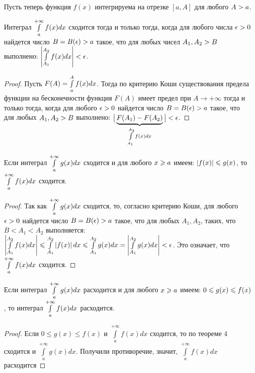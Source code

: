 \documentclass[a4paper,10pt]{article}
\begin{document}
	\begin{text}
		Пусть теперь функция $f(x)$ интегрируема на отрезке $[a, A]$
		 для любого $A \hm{>} a$.
	\end{text}
	
	\begin{nthm} \label{thm3}
		 Интеграл $\mathop{\int}\limits^{+ \infty}_a f(x)dx$ сходится тогда и только
		 тогда, когда для любого числа $\epsilon \hm{>} 0$ найдется число
		 $B \hm{=} B(\epsilon) \hm{>} a$ такое, что для любых чисел $A_1, A_2 \hm{>} B$
		 выполнено: $\left| \intl^{A_2}_{A_1} f(x)dx \right| \hm{<} \epsilon$.
	\end{nthm}
	\begin{proof}
		Пусть $F(A) \hm{=} \intl^A_a f(x)dx$. Тогда по критерию Коши существования
		 предела функции на бесконечности функция $F(A)$ имеет предел при $A\to+ \infty$
		 тогда и только тогда, когда для любого $\epsilon \hm{>} 0$ найдется число
		 $B \hm{=} B(\epsilon) \hm{>} a$ такое, что для любых $A_1, A_2 \hm{>} B$ выполнено:
		 $\big|\underbrace{ F(A_1) - F(A_2)}_{\int\limits_{A_1}^{A_2}f(x)dx}\big| \hm{<} \epsilon $. %
	\end{proof}
	
	\begin{nthm} \label{thm4}
		 Если интеграл $\mathop{\int}\limits^{+ \infty}_a g(x)dx$
		 сходится и для любого $x \hm{\ge} a$ имеем: $\left| f(x) \right| \hm{\le} g(x)$, то
		 $\mathop{\int}\limits^{+ \infty}_a f(x)dx$ сходится.
	\end{nthm}
	\begin{proof}
		Так как $\mathop{\int}\limits^{+ \infty}_a g(x)dx$ сходится, то, согласно критерию Коши,
		 для любого $\epsilon \hm{>} 0$ найдется число $B \hm{=} B(\epsilon) \hm{>} a$ такое, что
		 для любых $A_1, A_2$, таких, что $B<A_1<A_2$ выполняется: $\left| \intl^{A_2}_{A_1} f(x)dx \right|
		 \hm{\le} \intl^{A_2}_{A_1} \left| f(x) \right| dx \hm{\le} \intl^{A_2}_{A_1} g(x)dx \hm{=}
		 \left| \intl^{A_2}_{A_1} g(x)dx \right| \hm{<} \epsilon$. Это означает, что
		 $\mathop{\int}\limits^{+ \infty}_a f(x)dx$ сходится. %
	\end{proof}
	
	\begin{cor*}
		Если интеграл $\mathop{\int}\limits^{+ \infty}_a g(x)dx$ расходится и
		 для любого $x \hm{\ge} a$ имеем: $0 \hm{\le} g(x) \hm{\le} f(x)$,
		 то интеграл $\mathop{\int}\limits^{+ \infty}_a f(x)dx$ расходится.
	\end{cor*}
	\begin{proof}
		Если $0\le g(x)\le f(x)$ и $\int\limits_a^{+\infty}f(x)dx$ сходится, то по теореме 4 сходится и $\int\limits_a^{+\infty}g(x)dx$. Получили противоречие, значит, $\int\limits_a^{+\infty}f(x)dx$ расходится
	\end{proof}
\end{document}
